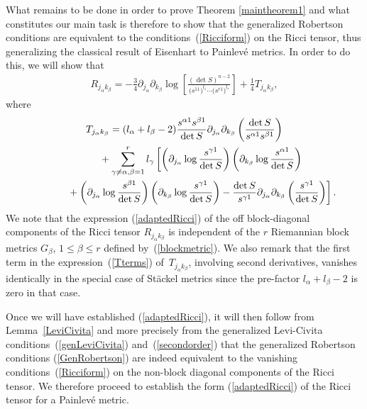 \documentclass[11pt]{article}
\numberwithin{equation}{section}
\newcommand{\jalpha}{j_{\alpha}}
\newcommand{\kbeta}{k_{\beta}}
\newcommand{\lbeta}{l_{\beta}}
\newcommand{\lalpha}{l_{\alpha}}
\begin{document}
\setcounter{section}{6}
\setcounter{subsection}{1}
\setcounter{subsubsection}{0}
\setcounter{Theorem}{0}
\setcounter{equation}{0}
What remains to be done in order to prove Theorem \ref{maintheorem1} and what constitutes our main task is therefore to show that the generalized Robertson conditions are equivalent to the conditions~(\ref{Ricciform}) on the Ricci tensor, thus generalizing the classical result of Eisenhart \cite{Eis1934} to Painlev\'e metrics. In order to do this, we will show that
\begin{gather}\label{adaptedRicci}
R_{\jalpha \kbeta}=-\frac{3}{4}\partial_{j_{\alpha}}\partial_{k_{\beta}}\log\left[\frac{(\det S)^{n-2}}{\big(s^{11}\big)^{l_{1}}\cdots \big(s^{r1}\big)^{l_{r}}}\right] + \frac{1}{4}T_{\jalpha \kbeta},
\end{gather}
where
\begin{gather}
T_{\jalpha \kbeta} =(l_{\alpha}+l_{\beta}-2)\frac{s^{\alpha 1}s^{\beta 1}}{\det S}\partial_{j_{\alpha}}\partial_{k_{\beta}}\left(\frac{\det S}{s^{\alpha 1}s^{\beta 1}}\right)\nonumber\\
\hphantom{T_{\jalpha \kbeta} =}{} +\sum_{\gamma\neq \alpha,\beta=1}^{r}l_{\gamma}\left[\left(\partial_{j_{\alpha}}\log\frac{s^{\gamma 1}}{\det S}\right)\left(\partial_{k_{\beta}}\log\frac{s^{\alpha 1}}{\det S}\right)\right.\nonumber\\
\left.\hphantom{T_{\jalpha \kbeta} =}{}+\left(\partial_{j_{\alpha}}\log\frac{s^{\beta 1}}{\det S}\right)\left(\partial_{k_{\beta}}\log\frac{s^{\gamma 1}}{\det S}\right)
-\frac{\det S}{s^{\gamma 1}}\partial_{j_{\alpha}}\partial_{k_{\beta}}\left(\frac{s^{\gamma 1}}{\det S}\right)\right].\label{Tterms}
\end{gather}
We note that the expression (\ref{adaptedRicci}) of the off block-diagonal components of the Ricci tensor $R_{\jalpha \kbeta}$ is independent of the $r$ Riemannian block metrics $G_{\beta}$, $1\leq \beta \leq r$ defined by~(\ref{blockmetric}). We also remark that the first term in the expression~(\ref{Tterms}) of~$T_{\jalpha \kbeta}$, involving second derivatives, vanishes identically in the special case of St\"ackel metrics since the pre-factor $\lalpha+\lbeta-2$ is zero in that case.

Once we will have established (\ref{adaptedRicci}), it will then follow from Lemma~\ref{LeviCivita} and more precisely from the generalized Levi-Civita conditions~(\ref{genLeviCivita}) and~(\ref{secondorder}) that the generalized Robertson conditions (\ref{GenRobertson}) are indeed equivalent to the vanishing conditions~(\ref{Ricciform}) on the non-block diagonal components of the Ricci tensor. We therefore proceed to establish the form (\ref{adaptedRicci}) of the Ricci tensor for a Painlev\'e metric.
\end{document}
